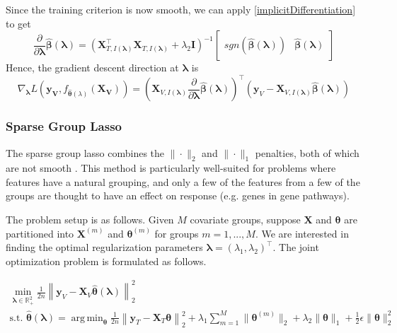 \documentclass[12pt,letterpaper]{article}
\DeclareMathOperator*{\argmin}{arg\,min}
\begin{document}
Since the training criterion is now smooth, we can apply \eqref{implicitDifferentiation} to get
\begin{equation}
\frac{\partial}{\partial \boldsymbol \lambda} \hat{\boldsymbol{\beta}}(\boldsymbol{\lambda}) = 
\left ( 
\boldsymbol{X}_{T, I(\boldsymbol\lambda)}^\top \boldsymbol{X}_{T, I(\boldsymbol\lambda)} + \lambda_2 \boldsymbol{I}
\right )^{-1}
\begin{bmatrix}
sgn \left (\hat{\boldsymbol{\beta}} (\boldsymbol{\lambda}) \right ) &
\hat{\boldsymbol{\beta}} (\boldsymbol{\lambda})
\end{bmatrix}
\end{equation}
Hence, the gradient descent direction at $\boldsymbol{\lambda}$ is
\begin{equation}
\nabla_{\boldsymbol \lambda} L(\boldsymbol{y_V}, f_{\hat{\boldsymbol{\theta}}(\lambda)}(\boldsymbol{X_V})) =
\left (
\boldsymbol{X}_{V, I(\boldsymbol\lambda)}
\frac{\partial}{\partial \boldsymbol \lambda} \hat{\boldsymbol{\beta}}(\boldsymbol{\lambda})
\right )^{\top}
\left (
\boldsymbol y_V - \boldsymbol{X}_{V, I(\boldsymbol\lambda)} \hat{\boldsymbol{\beta}} (\boldsymbol{\lambda})
\right )
\end{equation}

\subsubsection{Sparse Group Lasso}\label{sec:sgl}

The sparse group lasso combines the $\|\cdot\|_2$ and $\|\cdot\|_1$ penalties, both of which are not smooth \citep{simon2013sparse}. This method is particularly well-suited for problems where features have a natural grouping, and only a few of the features from a few of the groups are thought to have an effect on response (e.g. genes in gene pathways).

The problem setup is as follows. Given $M$ covariate groups, suppose $\boldsymbol{X}$ and $\boldsymbol \theta$ are partitioned into $\boldsymbol{X}^{(m)}$ and $\boldsymbol \theta^{(m)}$ for groups $m = 1, ... , M$. We are interested in finding the optimal regularization parameters $\boldsymbol{\lambda} = (\lambda_1, \lambda_2)^\top$. The joint optimization problem is formulated as follows.

\begin{equation}
\begin{array}{c}
\min_{\boldsymbol{\lambda} \in \mathbb{R}^2_{+}} \frac{1}{2n}
\left \| \boldsymbol{y}_V - \boldsymbol{X}_V \hat{\boldsymbol{\theta}}(\boldsymbol{\lambda}) \right \|^2_2 \\
\text{s.t. }
\hat{\boldsymbol{\theta}}(\boldsymbol{\lambda}) =
\argmin_{\boldsymbol{\theta}} \frac{1}{2n} 
\left \| \boldsymbol{y}_T - \boldsymbol{X}_T \boldsymbol{\theta} \right \|^2_2
+ \lambda_1 \sum_{m=1}^M \| \boldsymbol\theta^{(m)} \|_2
+ \lambda_2 \| \boldsymbol\theta \|_1
+ \frac{1}{2} \epsilon \| \boldsymbol\theta \|_2^2
\end{array}
\end{equation}
\end{document}
